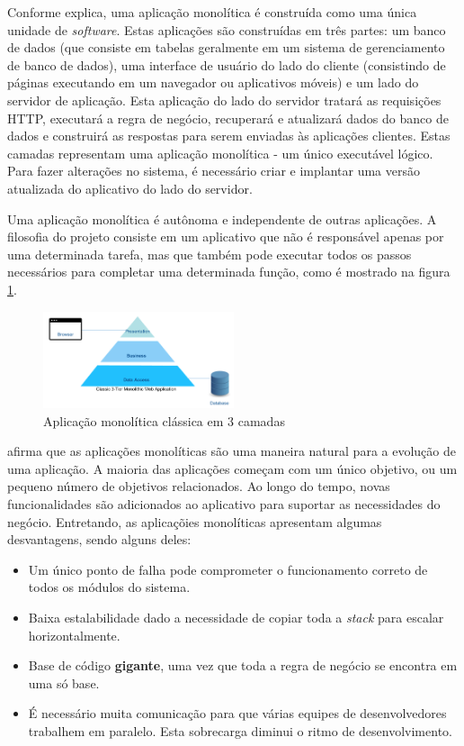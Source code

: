 Conforme  explica, uma aplicação monolítica é construída como uma única unidade de \textit{software}. Estas aplicações são construídas em três partes: um banco de dados (que consiste em tabelas geralmente em um sistema de gerenciamento de banco de dados), uma interface de usuário do lado do cliente (consistindo de páginas executando em um navegador ou aplicativos móveis) e um lado do servidor de aplicação. Esta aplicação do lado do servidor tratará as requisições HTTP, executará a regra de negócio, recuperará e atualizará dados do banco de dados e construirá as respostas para serem enviadas às aplicações clientes. Estas camadas representam uma aplicação monolítica - um único executável lógico. Para fazer alterações no sistema, é necessário criar e implantar uma versão atualizada do aplicativo do lado do servidor.

Uma aplicação monolítica é autônoma e independente de outras aplicações. A filosofia do projeto consiste em um aplicativo que não é responsável apenas por uma determinada tarefa, mas que também pode executar todos os passos necessários para completar uma determinada função, como é mostrado na figura \ref{fig:three-tier}.

\begin{figure}[htbp]
    \centering
    \includegraphics[width=0.5\textwidth]{figuras/three-tier.png}
    \caption{Aplicação monolítica clássica em 3 camadas}
    \label{fig:three-tier}
\end{figure}

 afirma que as aplicações monolíticas são uma maneira natural para a evolução de uma aplicação. A maioria das aplicações começam com um único objetivo, ou um pequeno número de objetivos relacionados. Ao longo do tempo, novas funcionalidades são adicionados ao aplicativo para suportar as necessidades do negócio. Entretando, as aplicaçõies monolíticas apresentam algumas desvantagens, sendo alguns deles: 

\begin{itemize}
    \item Um único ponto de falha pode comprometer o funcionamento correto de todos os módulos do sistema.
    \item Baixa estalabilidade dado a necessidade de copiar toda a \textit{stack} para escalar horizontalmente.
    \item Base de código \textbf{gigante}, uma vez que toda a regra de negócio se encontra em uma só base.
    \item É necessário muita comunicação para que várias equipes de desenvolvedores trabalhem em paralelo. Esta sobrecarga diminui o ritmo de desenvolvimento.
\end{itemize}

